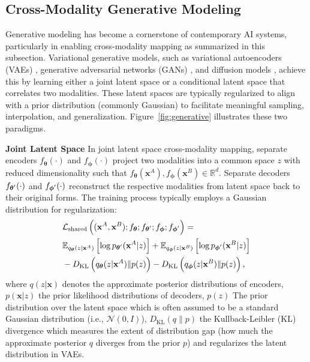 \documentclass[journal]{IEEEtran}
\begin{document}
\subsection{Cross-Modality Generative Modeling} \label{sect:generative}

Generative modeling has become a cornerstone of contemporary AI systems, particularly in enabling cross-modality mapping as summarized in this subsection. Variational generative models, such as variational autoencoders (VAEs) \cite{Kingma2013}, generative adversarial networks (GANs) \cite{Goodfellow2014}, and diffusion models \cite{Ho2020}, achieve this by learning either a joint latent space or a conditional latent space that correlates two modalities. These latent spaces are typically regularized to align with a prior distribution (commonly Gaussian) to facilitate meaningful sampling, interpolation, and generalization. Figure~\ref{fig:generative} illustrates these two paradigms.

\textbf{Joint Latent Space} In joint latent space cross-modality mapping, separate encoders $f_{\boldsymbol{\theta}} (\cdot)$ and $f_{\boldsymbol{\phi}} (\cdot)$ project two modalities into a common space $z$ with reduced dimensionality such that $f_{\boldsymbol{\theta}}(\mathbf{x}^{A}), f_{\boldsymbol{\phi}}(\mathbf{x}^{B}) \in \mathbb{R}^{d}$. Separate decoders $f_{\smash{\boldsymbol{\theta}'}} (\cdot)$ and $f_{\smash{\boldsymbol{\phi}'}} (\cdot)$ reconstruct the respective modalities from latent space back to their original forms. The training process typically employs a Gaussian distribution for regularization:
\begin{align}
& \mathcal{L}_{\text{shared}} \left( (\mathbf{x}^A, \mathbf{x}^B); f_{\boldsymbol{\theta}}; f_{\smash{\boldsymbol{\theta}'}}; f_{\boldsymbol{\phi}}; f_{\smash{\boldsymbol{\phi}'}} \right) = \nonumber \\ & \hfill \mathbb{E}_{q_{\boldsymbol{\theta}}(z | \mathbf{x}^A)} \left[ \log p_{\smash{\boldsymbol{\theta}'}}(\mathbf{x}^A | z) \right] + \mathbb{E}_{q_{\boldsymbol{\phi}}(z | \mathbf{x}^B)} \left[ \log p_{\smash{\boldsymbol{\phi}'}}(\mathbf{x}^B | z) \right] \nonumber \\ & \hfill - D_{\text{KL}} \left( q_{\boldsymbol{\theta}}(z | \mathbf{x}^A) \| p(z) \right) - D_{\text{KL}} \left( q_{\boldsymbol{\phi}}(z | \mathbf{x}^B) \| p(z) \right),
\end{align}
where $q (z | \mathbf{x})$ denotes the approximate posterior distributions of encoders, $p(\mathbf{x} | z)$ the prior likelihood distributions of decoders, $p(z)$ The prior distribution over the latent space which is often assumed to be a standard Gaussian distribution (i.e., $\mathcal{N}(0, I)$), $D_{\text{KL}}(q \| p)$ the Kullback-Leibler (KL) divergence which measures the extent of distribution gap (how much the approximate posterior $q$ diverges from the prior $p$) and regularizes the latent distribution in VAEs.
\end{document}
